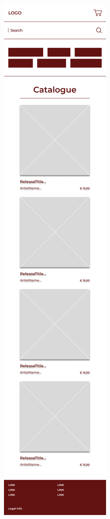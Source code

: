 \begin{figure}
	\centering
	\includegraphics[width=0.3\linewidth]{graphics/HomePageMobile}

\end{figure}
